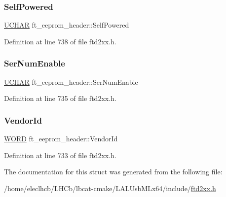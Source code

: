 \subsubsection{\texorpdfstring{Self\+Powered}{SelfPowered}}
{\footnotesize\ttfamily \hyperlink{CatCaloProto40MHz_2inc_2WinTypes_8h_a4f4bb67531a9bf6f0b9c6ad76aeba587}{U\+C\+H\+AR} ft\+\_\+eeprom\+\_\+header\+::\+Self\+Powered}



Definition at line 738 of file ftd2xx.\+h.

\mbox{\label{structft__eeprom__header_a04737398a9c4f758975303df5f0430e6}} 
\subsubsection{\texorpdfstring{Ser\+Num\+Enable}{SerNumEnable}}
{\footnotesize\ttfamily \hyperlink{CatCaloProto40MHz_2inc_2WinTypes_8h_a4f4bb67531a9bf6f0b9c6ad76aeba587}{U\+C\+H\+AR} ft\+\_\+eeprom\+\_\+header\+::\+Ser\+Num\+Enable}



Definition at line 735 of file ftd2xx.\+h.

\mbox{\label{structft__eeprom__header_a63538171dfe221e65f0bd27938239c30}} 
\subsubsection{\texorpdfstring{Vendor\+Id}{VendorId}}
{\footnotesize\ttfamily \hyperlink{CatCaloProto40MHz_2inc_2WinTypes_8h_a197942eefa7db30960ae396d68339b97}{W\+O\+RD} ft\+\_\+eeprom\+\_\+header\+::\+Vendor\+Id}



Definition at line 733 of file ftd2xx.\+h.



The documentation for this struct was generated from the following file\+:\begin{DoxyCompactItemize}
\item 
/home/eleclhcb/\+L\+H\+Cb/lbcat-\/cmake/\+L\+A\+L\+Usb\+M\+Lx64/include/\hyperlink{LALUsbMLx64_2include_2ftd2xx_8h}{ftd2xx.\+h}\end{DoxyCompactItemize}
